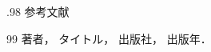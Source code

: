 \documentclass[dvipdfmx,10pt,notheor]{beamer}
\theoremstyle{definition}
\numberwithin{equation}{section}      %
\begin{document}
\begin{frame}{}
\vfill


\begin{columns}[T]
\begin{column}{.98\linewidth}
    参考文献
    \footnotesize                %
    \beamertemplatetextbibitems %
    \begin{thebibliography}{99}
        著者，
        タイトル，
        出版社，
        出版年．
    \end{thebibliography}           
\end{column}
\end{columns}


\vfill
\end{frame}
\end{document}
